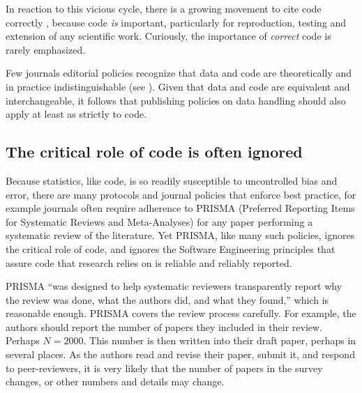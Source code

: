 \documentclass{comjnl}
\begin{document}

In reaction to this vicious cycle, there is a growing movement to cite code correctly \cite{cite-code,TOP}, because  code \emph{is\/} important, particularly for reproduction, testing and extension of any scientific work. Curiously, the importance of \emph{correct\/} code is rarely emphasized.

Few journals editorial policies recognize that data and code are theoretically and in practice indistinguishable (see \supplement). Given that data and code are equivalent and interchangeable, it follows that publishing policies on data handling should also apply at least as strictly to code.

\subsection{The critical role of code is often ignored}\label{central-role-of-code}\label{PRISMA-statement}
Because statistics, like code, is so readily susceptible to uncontrolled bias and error, there are many protocols and journal policies that enforce best practice, for example journals often require adherence to PRISMA (Preferred Reporting Items for Systematic Reviews and Meta-Analyses) \cite{prisma} for any paper performing a systematic review of the literature. Yet PRISMA, like many such policies, ignores the critical role of code, and ignores the Software Engineering principles that assure code that research relies on is reliable and reliably reported. 

PRISMA ``was designed to help systematic reviewers transparently report why the review was done, what the authors did, and what they found,'' which is reasonable enough. PRISMA covers the review process carefully. For example, the authors should report the number of papers they included in their review. Perhaps $N=2000$. This number is then written into their draft paper, perhaps in several places. As the authors read and revise their paper, submit it, and respond to peer-reviewers, it is very likely that the number of papers in the survey changes, or other numbers and details may change. 
\end{document}
